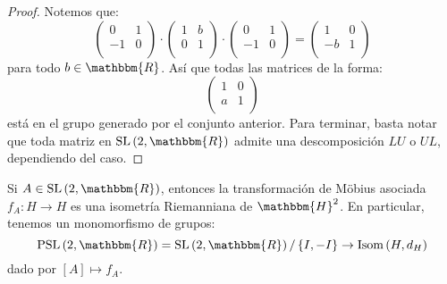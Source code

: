 \documentclass[12pt]{report}
\theoremstyle{largebreak}
\newcommand\cf[3]{\ensuremath{#1:#2\rightarrow#3}}
\newcommand{\bbm}[1]{\ensuremath{\mathbbm{#1}}}
\newcommand{\Isom}[1]{\ensuremath{\textup{Isom}\left(#1\right)}}
\newcommand{\SL}[1]{\ensuremath{\textup{SL}\left(#1\right)}}
\newcommand{\PSL}[1]{\ensuremath{\textup{PSL}\left(#1\right)}}
\begin{document}
    \begin{proof}
        Notemos que:
        \begin{equation*}
            \left(\begin{array}{cc}
                0 & 1 \\
                -1 & 0 \\
            \end{array} \right)\cdot\left(\begin{array}{cc}
                1 & b \\
                0 & 1 \\
            \end{array} \right)\cdot\left(\begin{array}{cc}
                0 & 1 \\
                -1 & 0 \\
            \end{array} \right)=\left(\begin{array}{cc}
                1 & 0 \\
                -b & 1 \\
            \end{array} \right)
        \end{equation*}
        para todo $b\in\bbm{R}$. Así que todas las matrices de la forma:
        \begin{equation*}
            \left(\begin{array}{cc}
                1 & 0 \\
                a & 1 \\
            \end{array} \right)
        \end{equation*}
        está en el grupo generado por el conjunto anterior. Para terminar, basta notar que toda matriz en $\SL{2,\bbm{R}}$ admite una descomposición $LU$ o $UL$, dependiendo del caso.
    \end{proof}

    \begin{propo}
        Si $A\in\SL{2,\bbm{R}}$, entonces la transformación de Möbius asociada $\cf{f_A}{H}{H}$ es una isometría Riemanniana de $\bbm{H}^2$. En particular, tenemos un monomorfismo de grupos:
        \begin{equation*}
            \PSL{2,\bbm{R}}=\SL{2,\bbm{R}}/\left\{I,-I \right\}\rightarrow\Isom{H,d_H}
        \end{equation*}
        dado por $[A]\mapsto f_A$.
    \end{propo}
\end{document}

